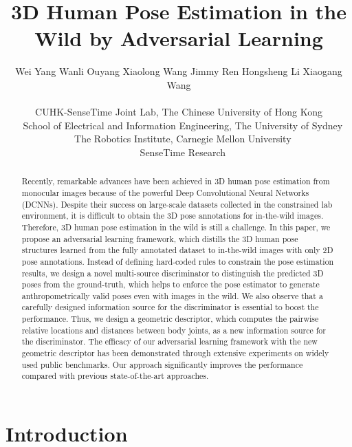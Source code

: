 \documentclass[10pt,twocolumn,letterpaper]{article}
\begin{document}
\title{3D Human Pose Estimation in the Wild by Adversarial Learning}

\author{
Wei Yang \quad 
Wanli Ouyang \quad 
Xiaolong Wang \quad 
Jimmy Ren \quad 
Hongsheng Li \quad
Xiaogang Wang \\ \\
 CUHK-SenseTime Joint Lab, The Chinese University of Hong Kong\\
~ School of Electrical and Information Engineering, The University of Sydney \\
~ The Robotics Institute, Carnegie Mellon University \\
~ SenseTime Research 
}


\maketitle
\thispagestyle{empty}

\begin{abstract}
Recently, remarkable advances  have been achieved in 3D human pose estimation from monocular images because of the powerful Deep Convolutional Neural Networks (DCNNs). 
	Despite their success on large-scale datasets collected in the constrained lab environment, it is difficult to obtain the 3D pose annotations for in-the-wild images. 
	Therefore, 3D human pose estimation in the wild is still a challenge. 	
	In this paper, we propose an adversarial learning framework, which distills the 3D human pose structures learned from the fully annotated dataset to in-the-wild images with only 2D pose annotations. 
	Instead of defining hard-coded rules to constrain the pose estimation results, we design a novel multi-source discriminator to distinguish the predicted 3D poses from the ground-truth, which helps to enforce the pose estimator to generate anthropometrically valid poses even with images in the wild. 
	We also observe that a carefully designed information source for the discriminator is essential to boost the performance. 
	Thus, we design a geometric descriptor, which computes the pairwise relative locations and distances between body joints, as a new information source for the discriminator. 
	The efficacy of our adversarial learning framework with the new geometric descriptor has been demonstrated through extensive experiments on widely used public benchmarks. 
	Our approach significantly improves the performance compared with previous state-of-the-art approaches. 
\end{abstract}

\section{Introduction}
\end{document}
